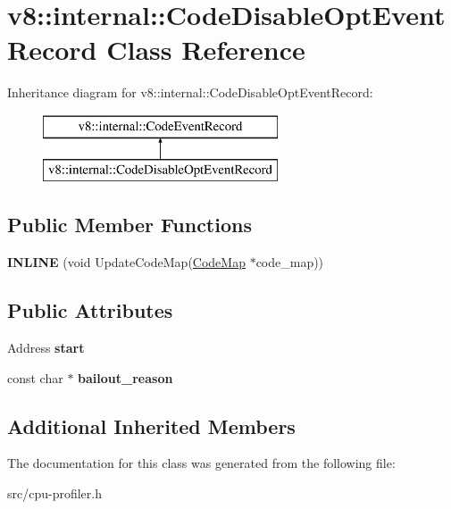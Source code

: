 \hypertarget{classv8_1_1internal_1_1_code_disable_opt_event_record}{}\section{v8\+:\+:internal\+:\+:Code\+Disable\+Opt\+Event\+Record Class Reference}
\label{classv8_1_1internal_1_1_code_disable_opt_event_record}
Inheritance diagram for v8\+:\+:internal\+:\+:Code\+Disable\+Opt\+Event\+Record\+:\begin{figure}[H]
\begin{center}
\leavevmode
\includegraphics[height=2.000000cm]{classv8_1_1internal_1_1_code_disable_opt_event_record}
\end{center}
\end{figure}
\subsection*{Public Member Functions}
\begin{DoxyCompactItemize}
\item 
\hypertarget{classv8_1_1internal_1_1_code_disable_opt_event_record_a70643a3c26f2b4c708182222eb7f705d}{}{\bfseries I\+N\+L\+I\+N\+E} (void Update\+Code\+Map(\hyperlink{classv8_1_1internal_1_1_code_map}{Code\+Map} $\ast$code\+\_\+map))\label{classv8_1_1internal_1_1_code_disable_opt_event_record_a70643a3c26f2b4c708182222eb7f705d}

\end{DoxyCompactItemize}
\subsection*{Public Attributes}
\begin{DoxyCompactItemize}
\item 
\hypertarget{classv8_1_1internal_1_1_code_disable_opt_event_record_a8fd92214fb6babcc3550e137fc4bbf7a}{}Address {\bfseries start}\label{classv8_1_1internal_1_1_code_disable_opt_event_record_a8fd92214fb6babcc3550e137fc4bbf7a}

\item 
\hypertarget{classv8_1_1internal_1_1_code_disable_opt_event_record_a2d72d8a8d6cf252077195aad743bb42d}{}const char $\ast$ {\bfseries bailout\+\_\+reason}\label{classv8_1_1internal_1_1_code_disable_opt_event_record_a2d72d8a8d6cf252077195aad743bb42d}

\end{DoxyCompactItemize}
\subsection*{Additional Inherited Members}


The documentation for this class was generated from the following file\+:\begin{DoxyCompactItemize}
\item 
src/cpu-\/profiler.\+h\end{DoxyCompactItemize}

